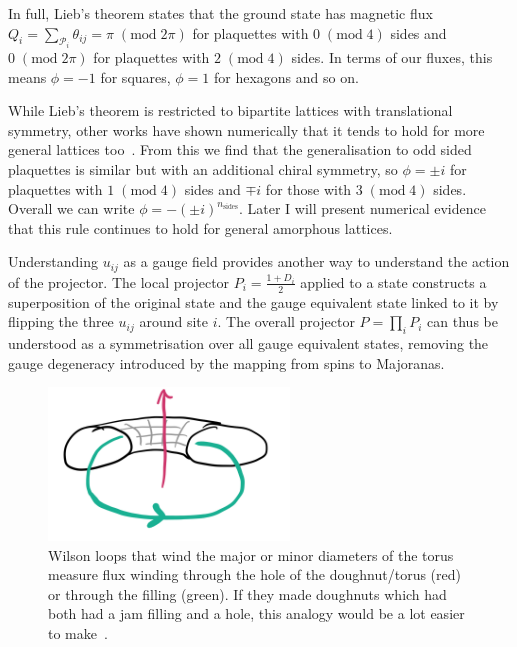 In full, Lieb's theorem states that the ground state has magnetic flux \(Q_i = \sum_{\mathcal{P}_i}\theta_{ij} = \pi \; (\mathrm{mod} \;2\pi)\) for plaquettes with \(0 \; (\mathrm{mod}\;4)\) sides and \(0 \; (\mathrm{mod}\;2\pi)\) for plaquettes with \(2 \; (\mathrm{mod}\;4)\) sides. In terms of our fluxes, this means \(\phi = -1\) for squares, \(\phi = 1\) for hexagons and so on.

While Lieb's theorem is restricted to bipartite lattices with translational symmetry, other works have shown numerically that it tends to hold for more general lattices too~\autocite{eschmannThermodynamicClassificationThreedimensional2020,Yao2009,eschmann2019thermodynamics,Peri2020}. From this we find that the generalisation to odd sided plaquettes is similar but with an additional chiral symmetry, so \(\phi = \pm i\) for plaquettes with \(1 \; (\mathrm{mod}\;4)\) sides and \(\mp i\) for those with \(3 \; (\mathrm{mod}\;4)\) sides. Overall we can write \(\phi = -(\pm i)^{n_{\mathrm{sides}}}\). Later I will present numerical evidence that this rule continues to hold for general amorphous lattices.

Understanding \(u_{ij}\) as a gauge field provides another way to understand the action of the projector. The local projector \(P_i = \frac{1 + D_i}{2}\) applied to a state constructs a superposition of the original state and the gauge equivalent state linked to it by flipping the three \(u_{ij}\) around site \(i\). The overall projector \(P = \prod_i P_i\) can thus be understood as a symmetrisation over all gauge equivalent states, removing the gauge degeneracy introduced by the mapping from spins to Majoranas.

\hypertarget{fig:topological_fluxes}{%
\begin{figure}
\centering
\includegraphics[width=0.57\textwidth,height=\textheight]{figure_code/amk_chapter/topological_fluxes.png}
\caption[{Topological Fluxes}]{Wilson loops that wind the major or minor diameters of the torus measure flux winding through the hole of the doughnut/torus (red) or through the filling (green). If they made doughnuts which had both had a jam filling and a hole, this analogy would be a lot easier to make~\autocite{parkerWhyDoesThis}.}
\label{fig:topological_fluxes}
\end{figure}
}

